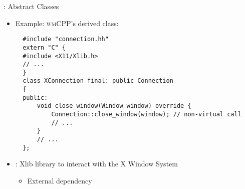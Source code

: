 \begin{frame}[c,fragile]{\underline{\cpp}: Abstract Classes \hfill {\footnotesize \currentname}}


    \vspace*{-5pt}\begin{itemize}

        \item Example: \textsc{wmCPP}'s  derived class:\\
\begin{verbatim}
  #include "connection.hh"
  extern "C" {
  #include <X11/Xlib.h>
  // ...
  }
  class XConnection final: public Connection
  {
  public:
      void close_window(Window window) override {
          Connection::close_window(window); // non-virtual call
          // ...
      }
      // ...
  };
\end{verbatim}

        \item {}: Xlib library to interact with the X Window System\\
            \begin{itemize}
                \item External dependency
            \end{itemize}


    \end{itemize}

    \vfill

\end{frame}

